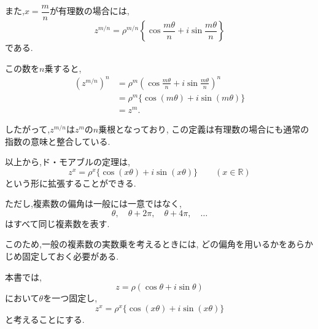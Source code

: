   また,$x=\dfrac{m}{n}$が有理数の場合には,
  \[
    z^{m/n}
    =
    \rho^{m/n}
    \left\{
      \cos\frac{m\theta}{n}
      +i\sin\frac{m\theta}{n}
    \right\}
  \]
  である.

  この数を$n$乗すると,
  \begin{align*}
    \left(
      z^{m/n}
    \right)^n
    &=
    \rho^m
    \left(
      \cos\frac{m\theta}{n}
      +i\sin\frac{m\theta}{n}
    \right)^n\\
    &=
    \rho^m
    \{
      \cos(m\theta)
      +i\sin(m\theta)
    \}\\
    &=
    z^m.
  \end{align*}

  したがって,$z^{m/n}$は$z^m$の$n$乗根となっており,
  この定義は有理数の場合にも通常の指数の意味と整合している.

  以上から,ド・モアブルの定理は,
  \[
    z^x
    =
    \rho^x
    \{
      \cos(x\theta)+i\sin(x\theta)
    \}
    \qquad(x\in\mathbb R)
  \]
  という形に拡張することができる.

  ただし,複素数の偏角は一般には一意ではなく,
  \[
    \theta,\quad
    \theta+2\pi,\quad
    \theta+4\pi,\quad\ldots
  \]
  はすべて同じ複素数を表す.

  このため,一般の複素数の実数乗を考えるときには,
  どの偏角を用いるかをあらかじめ固定しておく必要がある.

  本書では,
  \[
    z
    =
    \rho(
      \cos\theta+i\sin\theta
    )
  \]
  において$\theta$を一つ固定し,
  \[
    z^x
    =
    \rho^x
    \{
      \cos(x\theta)+i\sin(x\theta)
    \}
  \]
  と考えることにする.